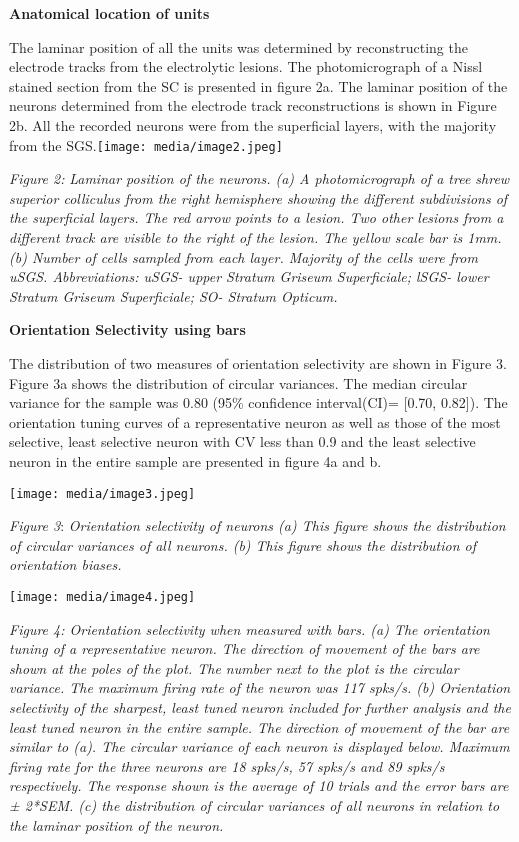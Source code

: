 \textbf{Anatomical location of units}

The laminar position of all the units was determined by reconstructing
the electrode tracks from the electrolytic lesions. The photomicrograph
of a Nissl stained section from the SC is presented in figure 2a. The
laminar position of the neurons determined from the electrode track
reconstructions is shown in Figure 2b. All the recorded neurons were
from the superficial layers, with the majority from the
SGS.\texttt{[image: media/image2.jpeg]}

\emph{Figure 2:} \emph{Laminar position of the neurons. (a) A
photomicrograph of a tree shrew superior colliculus from the right
hemisphere showing the different subdivisions of the superficial layers.
The red arrow points to a lesion. Two other lesions from a different
track are visible to the right of the lesion. The yellow scale bar is
1mm. (b) Number of cells sampled from each layer. Majority of the cells
were from uSGS. Abbreviations: uSGS- upper Stratum Griseum Superficiale;
lSGS- lower Stratum Griseum Superficiale; SO- Stratum Opticum.}

\textbf{Orientation Selectivity using bars}

The distribution of two measures of orientation selectivity are shown in
Figure 3. Figure 3a shows the distribution of circular variances. The
median circular variance for the sample was 0.80 (95\% confidence
interval(CI)= {[}0.70, 0.82{]}). The orientation tuning curves of a
representative neuron as well as those of the most selective, least
selective neuron with CV less than 0.9 and the least selective neuron in
the entire sample are presented in figure 4a and b.

\texttt{[image: media/image3.jpeg]}

\emph{Figure 3}: \emph{Orientation selectivity of neurons (a) This
figure shows the distribution of circular variances of all neurons. (b)
This figure shows the distribution of orientation biases.}

\texttt{[image: media/image4.jpeg]}

\emph{Figure 4: Orientation selectivity when measured with bars. (a) The
orientation tuning of a representative neuron. The direction of movement
of the bars are shown at the poles of the plot. The number next to the
plot is the circular variance. The maximum firing rate of the neuron was
117 spks/s. (b) Orientation selectivity of the sharpest, least tuned
neuron included for further analysis and the least tuned neuron in the
entire sample. The direction of movement of the bar are similar to (a).
The circular variance of each neuron is displayed below. Maximum firing
rate for the three neurons are 18 spks/s, 57 spks/s and 89 spks/s
respectively. The response shown is the average of 10 trials and the
error bars are ± 2*SEM. (c) the distribution of circular variances of
all neurons in relation to the laminar position of the neuron.}

